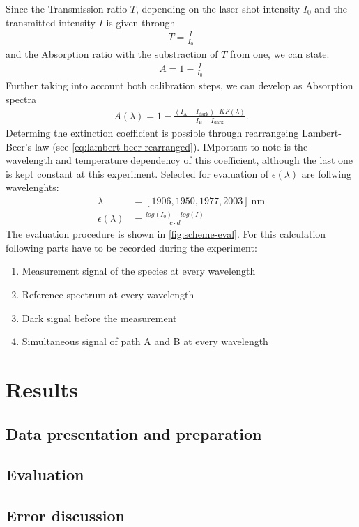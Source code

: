 Since the Transmission ratio $T$, depending on the laser shot intensity $I_\mathrm{0}$ and the transmitted intensity $I$ is given through 
\begin{align}
    T=\frac{I}{I_\mathrm{0}} \nonumber
\end{align}
and the Absorption ratio with the substraction of $T$ from one, we can state:
\begin{align}
    A=1-\frac{I}{I_\mathrm{0}} \nonumber
\end{align}
Further taking into account both calibration steps, we can develop as Absorption spectra
\begin{align}
    A(\lambda)=1-\frac{(I_\mathrm{A} - I_\mathrm{dark}) \cdot KF(\lambda)}{I_\mathrm{B} - I_\mathrm{dark}} \label{eq:absorption-spectrum}.
\end{align}
Determing the extinction coefficient is possible through rearrangeing Lambert-Beer's law (see \autoref{eq:lambert-beer-rearranged}). IMportant to note is the wavelength and temperature dependency of this coefficient, although the last one is kept constant at this experiment. Selected for evaluation of $\epsilon(\lambda)$ are follwing wavelenghts:
\begin{align}
    \lambda&=[1906, 1950, 1977, 2003]~\mathrm{nm} \nonumber \\[6pt]
    \epsilon(\lambda)&=\frac{log(I_\mathrm{0})-log(I)}{c \cdot d} \label{eq:lambert-beer-rearranged}
\end{align}
The evaluation procedure is shown in \autoref{fig:scheme-eval}. For this calculation following parts have to be recorded during the experiment:
\begin{enumerate}
    \item Measurement signal of the species at every wavelength
    \item Reference spectrum at every wavelength
    \item Dark signal before the measurement
    \item Simultaneous signal of path A and B at every wavelength
\end{enumerate}

\chapter{Results}
\label{chap:results}

\section{Data presentation and preparation}

\section{Evaluation}

\section{Error discussion}